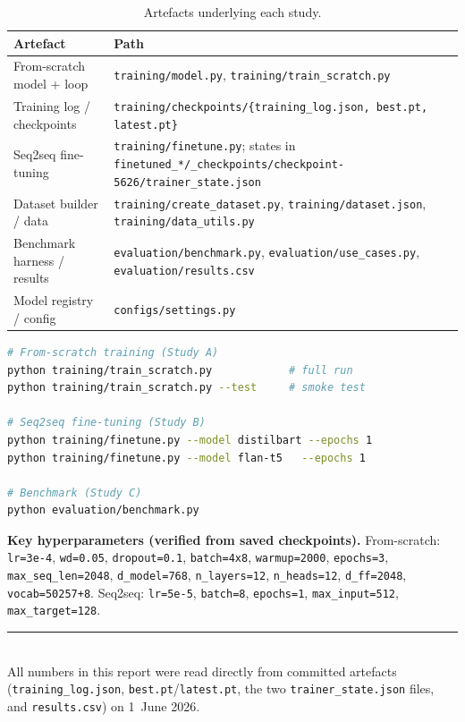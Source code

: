 \documentclass[11pt,a4paper]{article}
\begin{document}
\begin{table}[h]
\centering
\caption{Artefacts underlying each study.}
\label{tab:artefacts}
\small
\begin{tabularx}{\linewidth}{@{}l L@{}}
\toprule
\textbf{Artefact} & \textbf{Path} \\
\midrule
From-scratch model + loop   & \texttt{training/model.py}, \texttt{training/train\_scratch.py} \\
Training log / checkpoints  & \texttt{training/checkpoints/\{training\_log.json, best.pt, latest.pt\}} \\
Seq2seq fine-tuning         & \texttt{training/finetune.py}; states in \texttt{finetuned\_*/\_checkpoints/checkpoint-5626/trainer\_state.json} \\
Dataset builder / data      & \texttt{training/create\_dataset.py}, \texttt{training/dataset.json}, \texttt{training/data\_utils.py} \\
Benchmark harness / results & \texttt{evaluation/benchmark.py}, \texttt{evaluation/use\_cases.py}, \texttt{evaluation/results.csv} \\
Model registry / config     & \texttt{configs/settings.py} \\
\bottomrule
\end{tabularx}
\end{table}

\begin{lstlisting}[language=bash]
# From-scratch training (Study A)
python training/train_scratch.py            # full run
python training/train_scratch.py --test     # smoke test

# Seq2seq fine-tuning (Study B)
python training/finetune.py --model distilbart --epochs 1
python training/finetune.py --model flan-t5   --epochs 1

# Benchmark (Study C)
python evaluation/benchmark.py
\end{lstlisting}

\noindent
\textbf{Key hyperparameters (verified from saved checkpoints).}
From-scratch: \texttt{lr=3e-4}, \texttt{wd=0.05}, \texttt{dropout=0.1},
\texttt{batch=4x8}, \texttt{warmup=2000}, \texttt{epochs=3},
\texttt{max\_seq\_len=2048}, \texttt{d\_model=768}, \texttt{n\_layers=12},
\texttt{n\_heads=12}, \texttt{d\_ff=2048}, \texttt{vocab=50257+8}.
Seq2seq: \texttt{lr=5e-5}, \texttt{batch=8}, \texttt{epochs=1},
\texttt{max\_input=512}, \texttt{max\_target=128}.

\vspace{1em}
\noindent\rule{\linewidth}{0.4pt}\\[2pt]
\footnotesize All numbers in this report were read directly from committed
artefacts (\texttt{training\_log.json}, \texttt{best.pt}/\texttt{latest.pt}, the
two \texttt{trainer\_state.json} files, and \texttt{results.csv}) on 1~June
2026.
\end{document}

